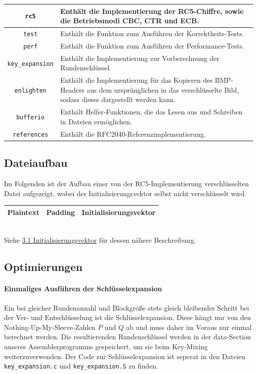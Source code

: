 \documentclass[course=erap]{aspdoc}
\begin{document}
\begin{center}
\begin{tabular}{ |c|m{11.2cm}| }
\hline
\texttt{rc5} & Enthält die Implementierung der RC5-Chiffre, sowie die Betriebsmodi CBC, CTR und ECB. \\
\hline
\texttt{test} & Enthält die Funktion zum Ausführen der Korrektheits-Tests. \\
\hline
\texttt{perf} & Enthält die Funktion zum Ausführen der Performance-Tests. \\
\hline
\texttt{key\_expansion} & Enthält die Implementierung zur Vorberechnung der Rundenschlüssel. \\
\hline
\texttt{enlighten} & Enthält die Implementierung für das Kopieren des BMP-Headers aus dem ursprünglichen in das verschlüsselte Bild, sodass dieses dargestellt werden kann. \\
\hline
\texttt{bufferio} & Enthält Helfer-Funktionen, die das Lesen aus und Schreiben in Dateien ermöglichen. \\
\hline
\texttt{references} & Enthält die RFC2040-Referenzimplementierung. \\
\hline
\end{tabular}
\end{center}

\subsection{Dateiaufbau}
Im Folgenden ist der Aufbau einer von der RC5-Implementierung verschlüsselten Datei aufgezeigt,
wobei der Initialisierungsvektor selbst nicht verschlüsselt wird.\\[1.5mm]
\begin{tabularx}{\textwidth}{|X|X|X|}
    \hline
    \centering Plaintext & \centering Padding & \centering\arraybackslash Initialisierungsvektor\\
    \hline
\end{tabularx}\\[1.5mm]
Siehe \hyperref[sec:Initialisierungsvektor]{3.1 Initialisierungsvektor} für dessen nähere
Beschreibung.

\subsection{Optimierungen}

\paragraph{Einmaliges Ausführen der Schlüsselexpansion} Ein bei gleicher Rundenanzahl und Blockgröße stets gleich bleibender Schritt bei der Ver- und Entschlüsselung ist die Schlüsselexpansion. Diese hängt nur von den Nothing-Up-My-Sleeve-Zahlen $P$ und $Q$ ab und muss daher im Voraus nur einmal berechnet werden. Die resultierenden Rundenschlüssel werden in der data-Section unseres Assemblerprogramms gespeichert, um sie beim Key-Mixing weiterzuverwenden. Der Code zur Schlüsselexpansion ist seperat in den Dateien \texttt{key\_expansion.c} und \texttt{key\_expansion.S} zu finden.
\end{document}
